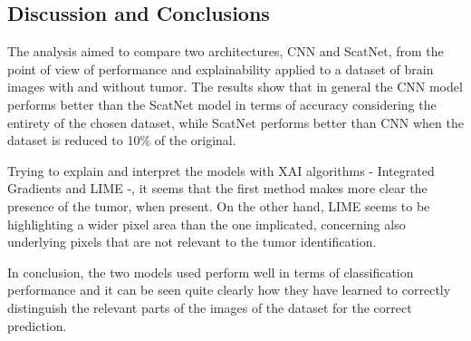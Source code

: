 \documentclass[11pt]{article}
\begin{document}
\begin{multicols*}{2}
\section{Discussion and Conclusions}
The analysis aimed to compare two architectures, CNN and ScatNet, from the point of view of performance and explainability applied to a dataset of brain images with and without tumor. The results show that in general the CNN model performs better than the ScatNet model in terms of accuracy considering the entirety of the chosen dataset, while ScatNet performs better than CNN when the dataset is reduced to 10\% of the original. 

Trying to explain and interpret the models with XAI algorithms - Integrated Gradients and LIME -, it seems that the first method makes more clear the presence of the tumor, when present. On the other hand, LIME seems to be highlighting a wider pixel area than the one implicated, concerning also underlying pixels that are not relevant to the tumor identification.

In conclusion, the two models used perform well in terms of classification performance and it can be seen quite clearly how they have learned to correctly distinguish the relevant parts of the images of the dataset for the correct prediction.

\newpage
\printbibliography






\end{multicols*}
\end{document}
